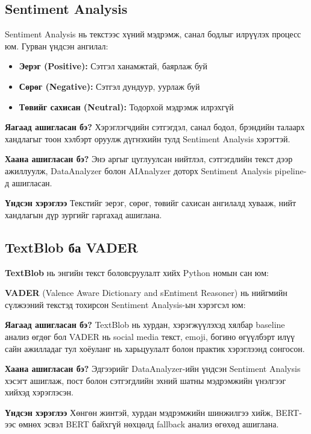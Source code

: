 \documentclass[12pt,a4paper]{report}
\begin{document}
\subsection{Sentiment Analysis}

Sentiment Analysis нь текстээс хүний мэдрэмж, санал бодлыг илрүүлэх процесс юм. Гурван үндсэн ангилал:

\begin{itemize}
    \item \textbf{Эерэг (Positive):} Сэтгэл ханамжтай, баярлаж буй
    \item \textbf{Сөрөг (Negative):} Сэтгэл дундуур, уурлаж буй
    \item \textbf{Төвийг сахисан (Neutral):} Тодорхой мэдрэмж илрэхгүй
\end{itemize}

\textbf{Яагаад ашигласан бэ?} Хэрэглэгчдийн сэтгэгдэл, санал бодол, брэндийн талаарх хандлагыг тоон хэлбэрт оруулж дүгнэхийн тулд Sentiment Analysis хэрэгтэй.

\textbf{Хаана ашигласан бэ?} Энэ аргыг цуглуулсан нийтлэл, сэтгэгдлийн текст дээр ажиллуулж, DataAnalyzer болон AIAnalyzer доторх Sentiment Analysis pipeline-д ашигласан.

\textbf{Үндсэн хэрэглээ} Текстийг эерэг, сөрөг, төвийг сахисан ангилалд хувааж, нийт хандлагын дүр зургийг гаргахад ашиглана.

\subsection{TextBlob ба VADER}

\textbf{TextBlob} нь энгийн текст боловсруулалт хийх Python номын сан юм:


\textbf{VADER} (Valence Aware Dictionary and sEntiment Reasoner) нь нийгмийн сүлжээний текстэд тохирсон Sentiment Analysis-ын хэрэгсэл юм:


\textbf{Яагаад ашигласан бэ?} TextBlob нь хурдан, хэрэгжүүлэхэд хялбар baseline анализ өгдөг бол VADER нь social media текст, emoji, богино өгүүлбэрт илүү сайн ажилладаг тул хоёуланг нь харьцуулалт болон практик хэрэглээнд сонгосон.

\textbf{Хаана ашигласан бэ?} Эдгээрийг DataAnalyzer-ийн үндсэн Sentiment Analysis хэсэгт ашиглаж, пост болон сэтгэгдлийн эхний шатны мэдрэмжийн үнэлгээг хийхэд хэрэглэсэн.

\textbf{Үндсэн хэрэглээ} Хөнгөн жинтэй, хурдан мэдрэмжийн шинжилгээ хийж, BERT-ээс өмнөх эсвэл BERT байхгүй нөхцөлд fallback анализ өгөхөд ашиглана.
\end{document}
